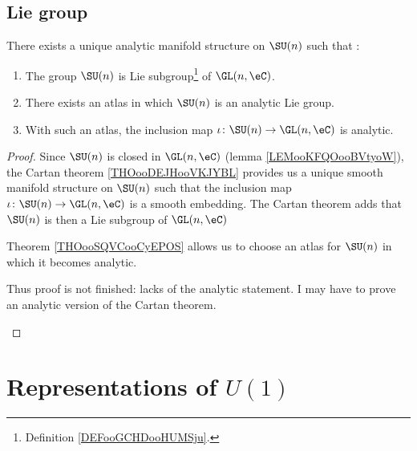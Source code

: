 \subsection{Lie group}

\begin{proposition}        \label{PROPooPXRJooLNnMFn}
	There exists a unique analytic manifold structure on \( \SU(n)\) such that :
	\begin{enumerate}
		\item       \label{ITEMooHZQRooFGCVjP}
		      The group \( \SU(n)\) is Lie subgroup\footnote{Definition \ref{DEFooGCHDooHUMSju}.} of \( \GL(n,\eC)\).
		\item
		      There exists an atlas in which \( \SU(n)\) is an analytic Lie group.
		\item
		      With such an atlas, the inclusion map \( \iota\colon \SU(n)\to \GL(n,\eC)\) is analytic.
	\end{enumerate}
\end{proposition}

\begin{proof}
	Since \( \SU(n)\) is closed in \( \GL(n,\eC)\) (lemma \ref{LEMooKFQOooBVtyoW}), the Cartan theorem \ref{THOooDEJHooVKJYBL} provides us a unique smooth manifold structure on \( \SU(n)\) such that the inclusion map \( \iota\colon \SU(n)\to \GL(n,\eC)\) is a smooth embedding. The Cartan theorem adds that \( \SU(n)\) is then a Lie subgroup of \( \GL(n,\eC)\)

	Theorem \ref{THOooSQVCooCyEPOS} allows us to choose an atlas for \( \SU(n)\) in which it becomes analytic.
	\begin{probleme}
		Thus proof is not finished: lacks of the analytic statement. I may have to prove an analytic version of the Cartan theorem.
	\end{probleme}
\end{proof}

\section{Representations of \texorpdfstring{$ U(1)$}{U(1)}}


